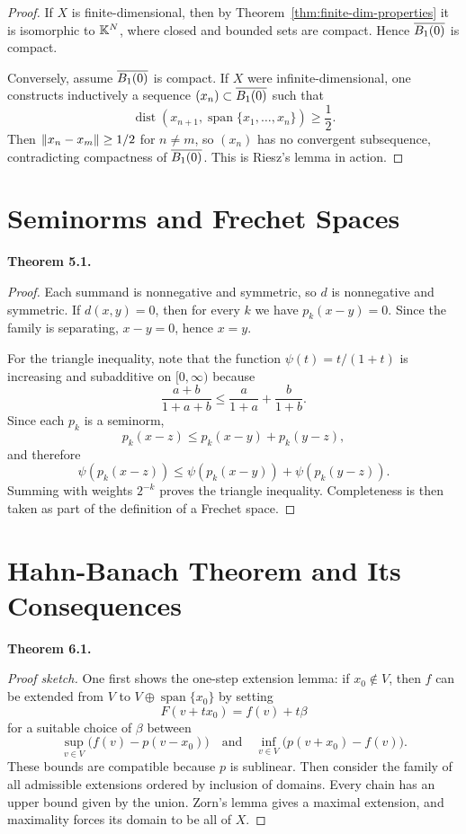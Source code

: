 \documentclass[11pt]{article}
\newenvironment{theoremstmt}[1]{%
  \par\medskip\noindent\textbf{Theorem #1. }\itshape
}{\par\medskip}
\begin{document}
\begin{proof}
If $X$ is finite-dimensional, then by Theorem~\ref{thm:finite-dim-properties} it is isomorphic to $\mathbb{K}^N$, where closed and bounded sets are compact. Hence $\overline{B_1(0)}$ is compact.

Conversely, assume $\overline{B_1(0)}$ is compact. If $X$ were infinite-dimensional, one constructs inductively a sequence $(x_n)\subset\overline{B_1(0)}$ such that
\[
\operatorname{dist}(x_{n+1},\operatorname{span}\{x_1,\dots,x_n\})\ge \frac12.
\]
Then $\left\lVert x_n-x_m\right\rVert\ge 1/2$ for $n\neq m$, so $(x_n)$ has no convergent subsequence, contradicting compactness of $\overline{B_1(0)}$. This is Riesz's lemma in action.
\end{proof}

\section{Seminorms and Frechet Spaces}

\begin{theoremstmt}{5.1}
\thmFrechetMetric
\end{theoremstmt}

\begin{proof}
Each summand is nonnegative and symmetric, so $d$ is nonnegative and symmetric. If $d(x,y)=0$, then for every $k$ we have $p_k(x-y)=0$. Since the family is separating, $x-y=0$, hence $x=y$.

For the triangle inequality, note that the function $\psi(t)=t/(1+t)$ is increasing and subadditive on $[0,\infty)$ because
\[
\frac{a+b}{1+a+b}\le \frac{a}{1+a}+\frac{b}{1+b}.
\]
Since each $p_k$ is a seminorm,
\[
p_k(x-z)\le p_k(x-y)+p_k(y-z),
\]
and therefore
\[
\psi(p_k(x-z))\le \psi(p_k(x-y)) + \psi(p_k(y-z)).
\]
Summing with weights $2^{-k}$ proves the triangle inequality. Completeness is then taken as part of the definition of a Frechet space.
\end{proof}

\section{Hahn-Banach Theorem and Its Consequences}

\begin{theoremstmt}{6.1}
\thmHahnBanachReal
\end{theoremstmt}

\begin{proof}[Proof sketch]
One first shows the one-step extension lemma: if $x_0\notin V$, then $f$ can be extended from $V$ to $V\oplus \operatorname{span}\{x_0\}$ by setting
\[
F(v+tx_0)=f(v)+t\beta
\]
for a suitable choice of $\beta$ between
\[
\sup_{v\in V}\bigl(f(v)-p(v-x_0)\bigr)
\quad\text{and}\quad
\inf_{v\in V}\bigl(p(v+x_0)-f(v)\bigr).
\]
These bounds are compatible because $p$ is sublinear. Then consider the family of all admissible extensions ordered by inclusion of domains. Every chain has an upper bound given by the union. Zorn's lemma gives a maximal extension, and maximality forces its domain to be all of $X$.
\end{proof}
\end{document}
